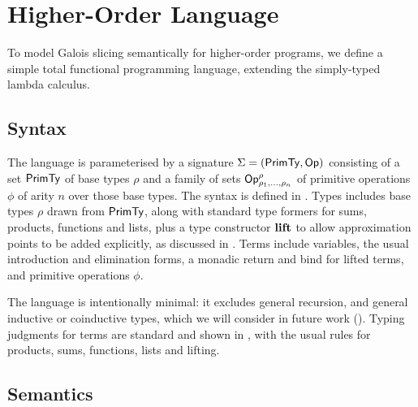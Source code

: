 \section{Higher-Order Language}
\label{sec:language}

To model Galois slicing semantically for higher-order programs, we define a simple total functional
programming language, extending the simply-typed lambda calculus.

\subsection{Syntax}
\label{sec:language:syntax}

The language is parameterised by a signature $\Sigma = (\mathsf{PrimTy}, \mathsf{Op})$ consisting of a set $\mathsf{PrimTy}$ of
base types $\rho$ and a family of sets $\mathsf{Op}^\rho_{\rho_1,\ldots,\rho_n}$ of primitive operations $\phi$ of
arity $n$ over those base types. The syntax is defined in . Types includes base types $\rho$
drawn from $\mathsf{PrimTy}$, along with standard type formers for sums, products, functions and lists, plus a type
constructor $\mathbf{lift}$ to allow approximation points to be added explicitly, as discussed in
. Terms include variables, the usual introduction and elimination forms, a monadic
return and bind for lifted terms, and primitive operations $\phi$.

The language is intentionally minimal: it excludes general recursion, and general inductive or coinductive
types, which we will consider in future work (). Typing judgments for terms are standard
and shown in , with the usual rules for products, sums, functions, lists and lifting.




\subsection{Semantics}
\label{sec:language:semantics}



